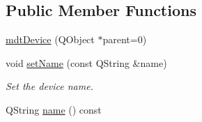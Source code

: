 \subsection*{Public Member Functions}
\begin{DoxyCompactItemize}
\item 
\hyperlink{classmdt_device_a6d501791e7243358cc61b144254b80db}{mdtDevice} (QObject $\ast$parent=0)
\item 
\hypertarget{classmdt_device_a80186f1aa6fbdc13f1652de978c35518}{
void \hyperlink{classmdt_device_a80186f1aa6fbdc13f1652de978c35518}{setName} (const QString \&name)}
\label{classmdt_device_a80186f1aa6fbdc13f1652de978c35518}

\begin{DoxyCompactList}\small\item\em Set the device name. \end{DoxyCompactList}\item 
\hypertarget{classmdt_device_a7ad893c6885dbaef5a6cb980bfe627e0}{
QString \hyperlink{classmdt_device_a7ad893c6885dbaef5a6cb980bfe627e0}{name} () const }
\label{classmdt_device_a7ad893c6885dbaef5a6cb980bfe627e0}


\end{DoxyCompactItemize}
